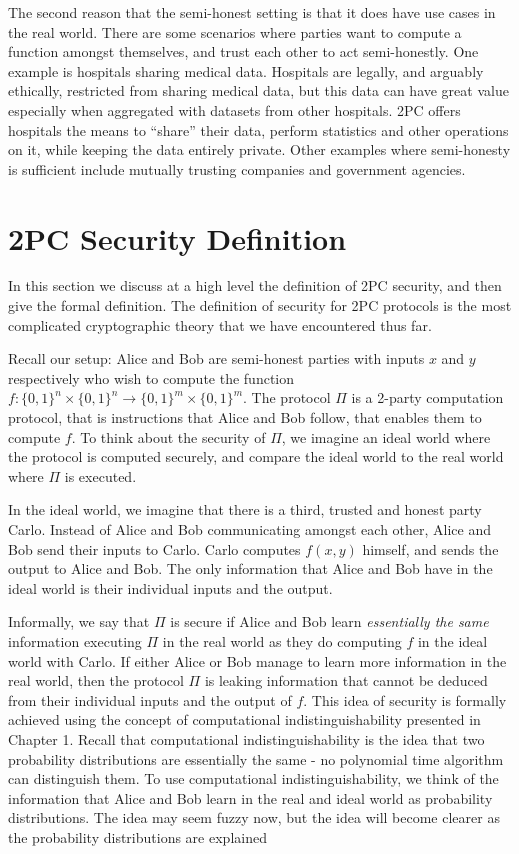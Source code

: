 The second reason that the semi-honest setting is that it does have use cases in the real world.
There are some scenarios where parties want to compute a function amongst themselves, and trust each other to act semi-honestly.
One example is hospitals sharing medical data.
Hospitals are legally, and arguably ethically, restricted from sharing medical data, but this data can have great value especially when aggregated with datasets from other hospitals.
2PC offers hospitals the means to ``share'' their data, perform statistics and other operations on it, while keeping the data entirely private. 
Other examples where semi-honesty is sufficient include mutually trusting companies and government agencies.

\section{2PC Security Definition}
In this section we discuss at a high level the definition of 2PC security, and then give the formal definition. 
The definition of security for 2PC protocols is the most complicated cryptographic theory that we have encountered thus far. 

Recall our setup: Alice and Bob are semi-honest parties with inputs $x$ and $y$ respectively who wish to compute the function $f: \{0,1\}^n \times \{0,1\}^n \to \{0,1\}^m \times \{0,1\}^m$.
The protocol $\Pi$ is a 2-party computation protocol, that is instructions that Alice and Bob follow, that enables them to compute $f$.
To think about the security of $\Pi$, we imagine an ideal world where the protocol is computed securely, and compare the ideal world to the real world where $\Pi$ is executed.

In the ideal world, we imagine that there is a third, trusted and honest party Carlo.
Instead of Alice and Bob communicating amongst each other, Alice and Bob send their inputs to Carlo.
Carlo computes $f(x,y)$ himself, and sends the output to Alice and Bob.
The only information that Alice and Bob have in the ideal world is their individual inputs and the output.

Informally, we say that $\Pi$ is secure if Alice and Bob learn \textit{essentially the same} information executing $\Pi$ in the real world as they do computing $f$ in the ideal world with Carlo.
If either Alice or Bob manage to learn more information in the real world, then the protocol $\Pi$ is leaking information that cannot be deduced from their individual inputs and the output of $f$.
This idea of security is formally achieved using the concept of computational indistinguishability presented in Chapter 1. 
Recall that computational indistinguishability is the idea that two probability distributions are essentially the same - no polynomial time algorithm can distinguish them.
To use computational indistinguishability, we think of the information that Alice and Bob learn in the real and ideal world as probability distributions.
The idea may seem fuzzy now, but the idea will become clearer as the probability distributions are explained


